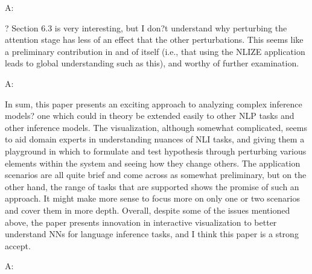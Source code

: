 A:

? Section 6.3 is very interesting, but I don?t understand why perturbing the attention stage has less of an effect that the other perturbations. This seems like a preliminary contribution in and of itself (i.e., that using the NLIZE application leads to global understanding such as this), and worthy of further examination.

A:

In sum, this paper presents an exciting approach to analyzing complex inference models? one which could in theory be extended easily to other NLP tasks and other inference models. The visualization, although somewhat complicated, seems to aid domain experts in understanding nuances of NLI tasks, and giving them a playground in which to formulate and test hypothesis through perturbing various elements within the system and seeing how they change others. The application scenarios are all quite brief and come across as somewhat preliminary, but on the other hand, the range of tasks that are supported shows the promise of such an approach. It might make more sense to focus more on only one or two scenarios and cover them in more depth. Overall, despite some of the issues mentioned above, the paper presents innovation in interactive visualization to better understand NNs for language inference tasks, and I think this paper is a strong accept.

A:
